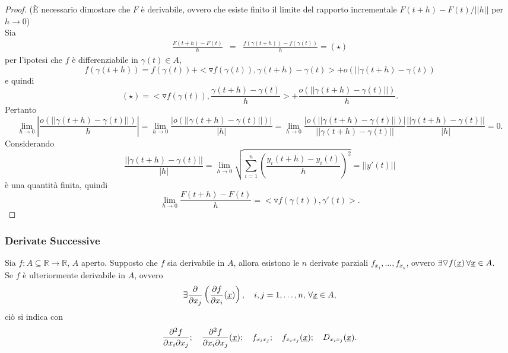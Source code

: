 \begin{proof}
	(È necessario dimostare che $F$ è derivabile, ovvero che esiste finito il limite del rapporto incrementale $F(t+h)-F(t)/||h||$ per $h\rightarrow 0$)\\
	Sia
	\begin{equation*}
		\begin{matrix}
			\frac{F(t+h)-F(t)}{h} &=& \frac{f(\gamma(t+h))-f(\gamma(t))}{h} = (\star)
		\end{matrix}
	\end{equation*}
	per l'ipotesi che $f$ è differenziabile in $\gamma(t)\in A$,
	\begin{equation*}
		f(\gamma(t+h)) = f(\gamma(t)) + <\triangledown f(\gamma(t)), \gamma(t+h) - \gamma(t)> + o(||\gamma(t+h)- \gamma(t))
	\end{equation*}
	e quindi
	\begin{equation*}
		(\star) = <\triangledown f(\gamma(t)), \frac{\gamma(t+h) - \gamma(t)}{h}> + \frac{o(||\gamma(t+h)- \gamma(t)||)}{h}.
	\end{equation*}
	Pertanto
	\begin{equation*}
			\lim\limits_{h\rightarrow 0} \left|\frac{o(||\gamma(t+h)- \gamma(t)||)}{h}\right| = \lim\limits_{h\rightarrow 0}\frac{|o(||\gamma(t+h)- \gamma(t)||)|}{|h|} = \lim\limits_{h\rightarrow 0}\frac{|o(||\gamma(t+h)- \gamma(t)||)|}{||\gamma(t+h)- \gamma(t)||}\frac{||\gamma(t+h)- \gamma(t)||}{|h|} = 0.
	\end{equation*}
	Considerando
	\begin{equation*}
		\frac{||\gamma(t+h)-\gamma(t)||}{|h|} = \lim\limits_{h\rightarrow 0}\sqrt{\sum_{i=1}^{n}\left(\frac{y_i(t+h)-y_i(t)}{h}\right)^2} =||y'(t)||
	\end{equation*}
	è una quantità finita, quindi
	\begin{equation*}
		\lim\limits_{h\rightarrow 0}\frac{F(t+h)-F(t)}{h} = <\triangledown f(\gamma(t)), \gamma'(t)>.
	\end{equation*}
\end{proof}

\subsubsection{Derivate Successive}
Sia $f:A\subseteq\mathbb{R}\rightarrow \mathbb{R}$, $A$ aperto. Supposto che $f$ sia derivabile in $A$, allora esistono le $n$ derivate parziali $f_{x_1},\hdots,f_{x_n}$, ovvero $\exists\triangledown f(\uline x)\,\forall \uline x\in A$.\\
Se $f$ è ulteriormente derivabile in $A$, ovvero
\begin{equation*}
	\exists \frac{\partial}{\partial x_j}\left(\frac{\partial f}{\partial x_i}(\uline x)\right),\quad i,j=1,\hdots, n,\, \forall\uline x\in A,
\end{equation*}
ciò si indica con
\begin{equation*}
		\frac{\partial ^2 f}{\partial x_i\partial x_j};\quad \frac{\partial ^2 f}{\partial x_i\partial x_j}(\uline x) ;\quad f_{x_ix_j};\quad f_{x_ix_j}(\uline x);\quad D_{x_ix_j}(\uline x).
\end{equation*}

